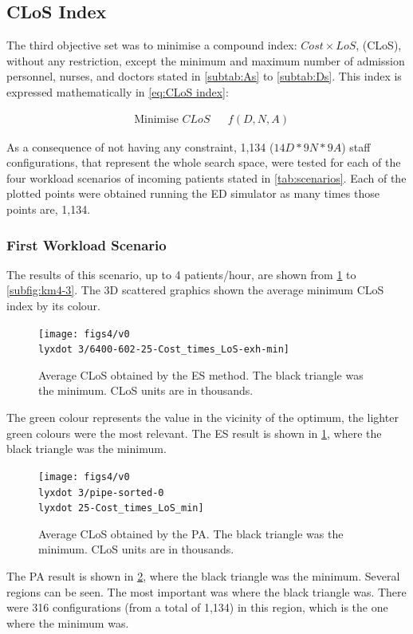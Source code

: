 \subsection{CLoS Index}

The third objective set was to minimise a compound index: $Cost\times LoS$,
(CLoS), without any restriction, except the minimum and maximum number
of admission personnel, nurses, and doctors stated in \ref{subtab:As}
to \ref{subtab:Ds}. This index is expressed mathematically in \ref{eq:CLoS index}:

\begin{equation}
\begin{aligned} & {\text{Minimise }CLoS} &  & f(D,N,A)\end{aligned}
\label{eq:CLoS index}
\end{equation}


As a consequence of not having any constraint, 1,134 ($14D*9N*9A$)
staff configurations, that represent the whole search space, were
tested for each of the four workload scenarios of incoming patients
stated in \ref{tab:scenarios}. Each of the plotted points were obtained
running the ED simulator as many times those points are, 1,134.


\subsubsection{First Workload Scenario}

The results of this scenario, up to 4 patients/hour, are shown from
\ref{subfig:es4-3} to \ref{subfig:km4-3}. The 3D scattered graphics
shown the average minimum CLoS index by its colour. 
\begin{figure}[H]
\centering{}\texttt{[image: figs4/v0\\lyxdot 3/6400-602-25-Cost\_times\_LoS-exh-min]}\caption{Average CLoS obtained by the ES method. The black triangle was the
minimum. CLoS units are in thousands. \label{subfig:es4-3}}
\end{figure}
The green colour represents the value in the vicinity of the optimum,
the lighter green colours were the most relevant. The ES result is
shown in \ref{subfig:es4-3}, where the black triangle was the minimum. 

\begin{figure}[H]
\centering{}\texttt{[image: figs4/v0\\lyxdot 3/pipe-sorted-0\\lyxdot 25-Cost\_times\_LoS\_min]}\caption{Average CLoS obtained by the PA. The black triangle was the minimum.
CLoS units are in thousands.\label{subfig:pipe4-3}}
\end{figure}
The PA result is shown in \ref{subfig:pipe4-3}, where the black triangle
was the minimum. Several regions can be seen. The most important was
where the black triangle was. There were 316 configurations (from
a total of 1,134) in this region, which is the one where the minimum
was.


